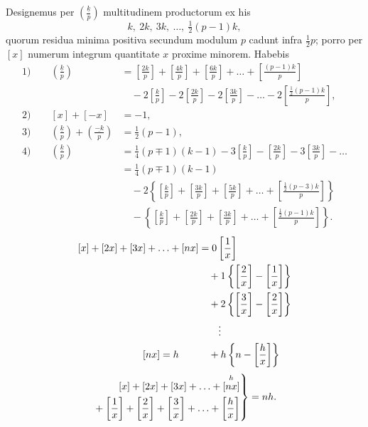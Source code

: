 \NoSourceHead
{}
\begingroup
\newcommand{\Decident}[2]{\left(\frac{\underline{#1}}{#2}\right)}
\par\indent Designemus per $\Decident{k}{p}$ multitudinem productorum ex his
\[
k,\ 2k,\ 3k,\ \ldots,\ \tfrac12(p-1)k,
\]
\noindent quorum residua minima positiva secundum modulum $p$ cadunt infra $\tfrac12p$; porro per $[x]$ numerum integrum quantitate $x$ proxime minorem. Habebis
\begin{align*}
1)\qquad \Decident{k}{p}&=\left[\frac{2k}{p}\right]+\left[\frac{4k}{p}\right]+\left[\frac{6k}{p}\right]+\ldots+\left[\frac{(p-1)k}{p}\right]\\
&\quad-2\left[\frac{k}{p}\right]-2\left[\frac{2k}{p}\right]-2\left[\frac{3k}{p}\right]-\ldots-2\left[\frac{\tfrac12(p-1)k}{p}\right],\\[1ex]
2)\qquad [x]+[-x]&=-1,\\[1ex]
3)\qquad \Decident{k}{p}+\Decident{-k}{p}&=\tfrac12(p-1),\\[1ex]
4)\qquad \Decident{k}{p}&=\tfrac14(p\mp1)(k-1)-3\left[\frac{k}{p}\right]-\left[\frac{2k}{p}\right]-3\left[\frac{3k}{p}\right]-\ldots\\
&=\tfrac14(p\mp1)(k-1)\\
&\quad-2\left\{\left[\frac{k}{p}\right]+\left[\frac{3k}{p}\right]+\left[\frac{5k}{p}\right]+\ldots+\left[\frac{\tfrac12(p-3)k}{p}\right]\right\}\\
&\quad-\left\{\left[\frac{k}{p}\right]+\left[\frac{2k}{p}\right]+\left[\frac{3k}{p}\right]+\ldots+\left[\frac{\tfrac12(p-1)k}{p}\right]\right\}.
\end{align*}
\clearpage
{}
\[
\begin{aligned}
\relax[x]+[2x]+[3x]+\ldots+[nx]&=0\left[\frac1x\right]\\
&\quad+1\left\{\left[\frac2x\right]-\left[\frac1x\right]\right\}\\
&\quad+2\left\{\left[\frac3x\right]-\left[\frac2x\right]\right\}\\
&\qquad\vdots\\
[nx]=h\qquad&\quad+h\left\{n-\left[\frac hx\right]\right\}
\end{aligned}
\]
\[
\left.\begin{aligned}
\relax[x]+[2x]+[3x]+\ldots+\overset{h}{[nx]}&\\
{}+\left[\frac1x\right]+\left[\frac2x\right]+\left[\frac3x\right]+\ldots+\left[\frac hx\right]&
\end{aligned}\right\}=nh.
\]
